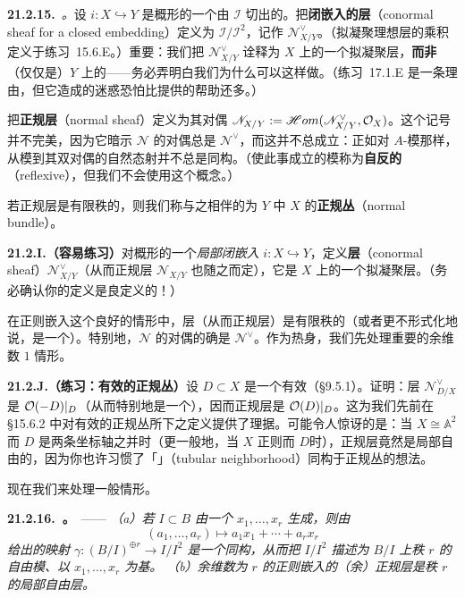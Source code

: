 \textbf{21.2.15.}\ \emph{\trhDefinition{}。}\quad 设 $i\colon X\hookrightarrow Y$ 是概形的一个由\trIdealSheaf{} $\mathscr{I}$ 切出的\trClosedEmbedding。把\textbf{闭嵌入的\trConormal{}层}（conormal sheaf for a closed embedding）定义为 $\mathscr{I}/\mathscr{I}^2$，记作 $\mathscr{N}^{\vee}_{X/Y}$。（拟凝聚理想层的乘积定义于\mbox{练习~15.6.E}。）重要：我们把 $\mathscr{N}^{\vee}_{X/Y}$ 诠释为 $X$ 上的一个拟凝聚层，\textbf{而非}（仅仅是）$Y$ 上的——务必弄明白我们为什么可以这样做。（\mbox{练习~17.1.E} 是一条理由，但它造成的迷惑恐怕比提供的帮助还多。）

把\textbf{正规层}（normal sheaf）定义为其对偶 $\mathscr{N}_{X/Y}:=\mathscr{H}om(\mathscr{N}^{\vee}_{X/Y},\mathcal{O}_X)$。这个记号并不完美，因为它暗示 $\mathscr{N}$ 的对偶总是 $\mathscr{N}^{\vee}$，而这并不总成立：正如对 $A$-模那样，从模到其双对偶的自然态射并不总是同构。（使此事成立的模称为\textbf{自反的}（reflexive），但我们不会使用这个概念。）

若正规层是有限秩的\trLocallyFreeSheaf，则我们称与之相伴的\trVectorBundle{}为 $Y$ 中 $X$ 的\textbf{正规丛}（normal bundle）。

\textbf{21.2.I.（容易练习）}\quad 对概形的一个\emph{局部闭嵌入} $i\colon X\hookrightarrow Y$，定义\textbf{\trConormal{}层}（conormal sheaf）$\mathscr{N}^{\vee}_{X/Y}$（从而正规层 $\mathscr{N}_{X/Y}$ 也随之而定），它是 $X$ 上的一个拟凝聚层。（务必确认你的定义是良定义的！）

在正则嵌入这个良好的情形中，\trConormal{}层（从而正规层）是有限秩的\trLocallyFreeSheaf（或者更不形式化地说，是一个\trVectorBundle）。特别地，$\mathscr{N}$ 的对偶的确是 $\mathscr{N}^{\vee}$。作为热身，我们先处理重要的余维数 $1$ 情形。

\textbf{21.2.J.（练习：有效\trCartierDivisor{}的正规丛）}\quad 设 $D\subset X$ 是一个有效\trCartierDivisor（\S9.5.1）。证明：\trConormal{}层 $\mathscr{N}^{\vee}_{D/X}$ 是 $\mathcal{O}(-D)|_D$（从而特别地是一个\trInvertibleSheaf），因而正规层是 $\mathcal{O}(D)|_D$。这为我们先前在 \S15.6.2 中对有效\trCartierDivisor{}的正规丛所下之定义提供了理据。可能令人惊讶的是：当 $X\cong\mathbb{A}^2$ 而 $D$ 是两条坐标轴之并时（更一般地，当 $X$ 正则而 $D$\trSingular{}时），正规层竟然是局部自由的，因为你也许习惯了「\trTubularNeighborhood」（tubular neighborhood）同构于正规丛的想法。

现在我们来处理一般情形。

\textbf{21.2.16.\ \trhProposition。}\ ——
\emph{（a）若\trIdeal{} $I\subset B$ 由一个\trRegularSequence{} $x_1,\dots,x_r$ 生成，则由
\begin{equation*}\tag{21.2.16.1}\label{eq:regular-sequence-conormal}
(a_1,\dots,a_r)\longmapsto a_1x_1+\cdots+a_rx_r
\end{equation*}
给出的映射 $\gamma\colon(B/I)^{\oplus r}\to I/I^2$ 是一个同构，从而把 $I/I^2$ 描述为 $B/I$ 上秩 $r$ 的自由模、以 $x_1,\dots,x_r$ 为基。
（b）余维数为 $r$ 的正则嵌入的（余）正规层是秩 $r$ 的局部自由层。}

